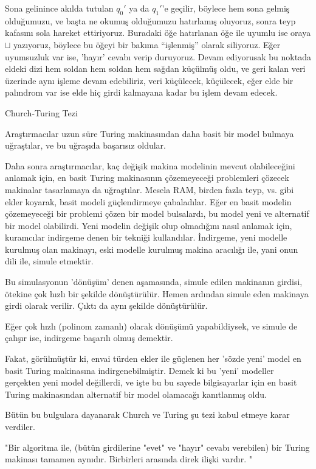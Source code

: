 \documentclass[12pt,fleqn]{article}\usepackage{../../common}
\begin{document}
Sona gelinince akılda tutulan $q_0'$ ya da $q_1'$'e geçilir, böylece hem
sona gelmiş olduğumuzu, ve başta ne okumuş olduğumuzu hatırlamış oluyoruz,
sonra teyp kafasını sola hareket ettiriyoruz. Buradaki öğe hatırlanan öğe
ile uyumlu ise oraya $\sqcup$ yazıyoruz, böylece bu öğeyi bir bakıma
``işlenmiş'' olarak siliyoruz. Eğer uyumsuzluk var ise, 'hayır' cevabı
verip duruyoruz. Devam ediyorusak bu noktada eldeki dizi hem soldan hem
soldan hem sağdan küçülmüş oldu, ve geri kalan veri üzerinde aynı işleme
devam edebiliriz, veri küçülecek, küçülecek, eğer elde bir palındrom var
ise elde hiç girdi kalmayana kadar bu işlem devam edecek.

Church-Turing Tezi

Araştırmacılar uzun süre Turing makinasından daha basit bir model bulmaya
uğraştılar, ve bu uğraşıda başarısız oldular.

Daha sonra araştırmacılar, kaç değişik makina modelinin mevcut olabileceğini
anlamak için, en basit Turing makinasının çözemeyeceği problemleri çözecek
makinalar tasarlamaya da uğraştılar. Mesela RAM, birden fazla teyp, vs. gibi
ekler koyarak, basit modeli güçlendirmeye çabaladılar. Eğer en basit modelin
çözemeyeceği bir problemi çözen bir model bulsalardı, bu model yeni ve
alternatif bir model olabilirdi. Yeni modelin değişik olup olmadığını nasıl
anlamak için, kuramcılar indirgeme denen bir tekniği kullandılar. İndirgeme,
yeni modelle kurulmuş olan makinayı, eski modelle kurulmuş makina aracılığı ile,
yani onun dili ile, simule etmektir.

Bu simulasyonun 'dönüşüm' denen aşamasında, simule edilen makinanın
girdisi, ötekine çok hızlı bir şekilde dönüştürülür. Hemen ardından simule
eden makinaya girdi olarak verilir. Çıktı da aynı şekilde dönüştürülür.

Eğer çok hızlı (polinom zamanlı) olarak dönüşümü yapabildiysek, ve simule
de çalışır ise, indirgeme başarılı olmuş demektir.

Fakat, görülmüştür ki, envai türden ekler ile güçlenen her 'sözde yeni' model en
basit Turing makinasına indirgenebilmiştir. Demek ki bu 'yeni' modeller
gerçekten yeni model değillerdi, ve işte bu bu sayede bilgisayarlar için en
basit Turing makinasından alternatif bir model olamacağı kanıtlanmış oldu.

Bütün bu bulgulara dayanarak Church ve Turing şu tezi kabul etmeye karar
verdiler.

"Bir algoritma ile, (bütün girdilerine "evet" ve "hayır" cevabı verebilen) bir
Turing makinası tamamen aynıdır. Birbirleri arasında direk ilişki vardır. "
\end{document}
